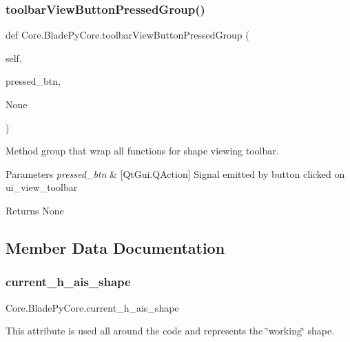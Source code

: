 \subsubsection{\texorpdfstring{toolbar\+View\+Button\+Pressed\+Group()}{toolbarViewButtonPressedGroup()}}
{\footnotesize\ttfamily def Core.\+Blade\+Py\+Core.\+toolbar\+View\+Button\+Pressed\+Group (\begin{DoxyParamCaption}\item[{}]{self,  }\item[{}]{pressed\+\_\+btn,  }\item[{}]{None }\end{DoxyParamCaption})}



Method group that wrap all functions for shape viewing toolbar. 


\begin{DoxyParams}{Parameters}
{\em pressed\+\_\+btn} & \mbox{[}Qt\+Gui.\+Q\+Action\mbox{]} Signal emitted by button clicked on ui\+\_\+view\+\_\+toolbar \\
\hline
\end{DoxyParams}
\begin{DoxyReturn}{Returns}
None 
\end{DoxyReturn}


\subsection{Member Data Documentation}
\hypertarget{a00081_a84a62c3017515ec840e35dbbe8ccbf21}{}\label{a00081_a84a62c3017515ec840e35dbbe8ccbf21} 
\subsubsection{\texorpdfstring{current\+\_\+h\+\_\+ais\+\_\+shape}{current\_h\_ais\_shape}}
{\footnotesize\ttfamily Core.\+Blade\+Py\+Core.\+current\+\_\+h\+\_\+ais\+\_\+shape}



This attribute is used all around the code and represents the \char`\"{}working\char`\"{} shape. 

\hypertarget{a00081_abe828f3ea500c70a4abe0f376b6d8dc4}{}\label{a00081_abe828f3ea500c70a4abe0f376b6d8dc4} 
